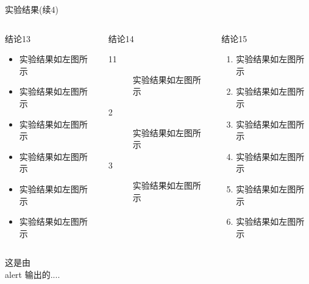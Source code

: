 \documentclass[8pt,compress,t,notheorems,noamsthm,notheorem,xcolor=x11names]{beamer}
\theoremstyle{nonumberplain}%
\theoremstyle{plain}
\begin{document}
\begin{frame}{实验结果(续4)}
\begin{columns}[T,onlytextwidth]
	
	\begin{column}{0.30\textwidth}
		\begin{Block}{结论13}
			\begin{itemize}
				\item 实验结果如左图所示
				\item 实验结果如左图所示
				\item 实验结果如左图所示
				\item 实验结果如左图所示
				\item 实验结果如左图所示
				\item 实验结果如左图所示
			\end{itemize}
		\end{Block}
	\end{column}
	
	\begin{column}{0.30\textwidth}
		\begin{Block}{结论14}
			\begin{description}
				\item[11] 实验结果如左图所示
				\item[2] 实验结果如左图所示
				\item[3] 实验结果如左图所示
				
			\end{description}
		\end{Block}
	\end{column}
	
	\begin{column}{0.30\textwidth}
		\begin{Block}{结论15}
			\begin{enumerate}
				\item 实验结果如左图所示
				\item 实验结果如左图所示
				\item 实验结果如左图所示
				\item 实验结果如左图所示
				\item 实验结果如左图所示
				\item 实验结果如左图所示
			\end{enumerate}
		\end{Block}
	\end{column}
\end{columns}

\alert{这是由 \\ alert 输出的....}

\end{frame}
\end{document}
